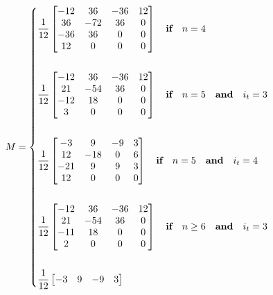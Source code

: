\documentclass{article}
\begin{document}
  \begin{equation}
        M = \begin{dcases} 
            \frac{1}{12}\begin{bmatrix} -12 &  36 & -36 & 12 \\
                                         36 & -72 & 36 & 0 \\
                                        -36 &  36 & 0 & 0 \\
                                         12 &  0  & 0 & 0 \end{bmatrix} \quad \textbf{if} \quad n = 4 \\\\
            \frac{1}{12}\begin{bmatrix} -12 &  36 & -36 & 12 \\
                                         21 & -54 &  36 & 0 \\
                                        -12 &  18 &  0  & 0 \\
                                          3 &  0  &  0  & 0 \end{bmatrix} \quad \textbf{if} \quad n = 5 \quad \textbf{and} \quad i_t = 3 \\\\
            \frac{1}{12}\begin{bmatrix} -3  &  9   & -9 & 3 \\
                                         12 & -18  &  0 & 6 \\
                                        -21 &  9   &  9 & 3 \\
                                         12 &  0   &  0 & 0 \end{bmatrix} \quad \textbf{if} \quad n = 5 \quad \textbf{and} \quad i_t = 4 \\\\
            \frac{1}{12}\begin{bmatrix} -12 &  36 & -36 & 12 \\
                                         21 & -54 &  36 & 0\\
                                        -11 &  18 &  0  & 0\\
                                         2  &  0  &  0  & 0 \end{bmatrix} \quad \textbf{if} \quad n \geq 6 \quad \textbf{and} \quad i_t = 3 \\\\
            \frac{1}{12}\begin{bmatrix} -3 & 9 & -9 & 3 \\

\end{bmatrix}
\end{dcases}
\end{equation}
\end{document}
